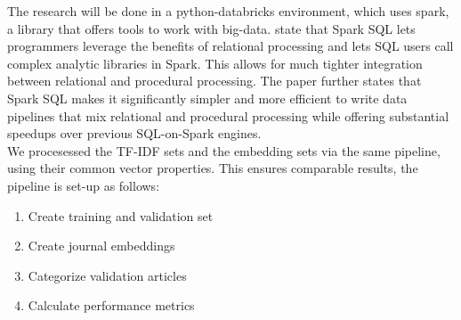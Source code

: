 \documentclass[../../Thesis.tex]{subfiles}
\begin{document}
The research will be done in a python-databricks environment, which uses spark, a library that offers tools to work with big-data. \citet{armbrust2015spark} state that Spark SQL lets programmers leverage the benefits of relational processing and lets SQL users call complex analytic libraries in Spark. This allows for much tighter integration between relational and procedural processing. The paper further states that Spark SQL makes it significantly simpler and more efficient to write data pipelines that mix relational and procedural processing while offering substantial speedups over previous SQL-on-Spark engines.\\
We procesessed the TF-IDF sets and the embedding sets via the same pipeline, using their common vector properties. This ensures comparable results, the pipeline is set-up as follows:
\begin{enumerate}
\item{Create training and validation set}
\item{Create journal embeddings}
\item{Categorize validation articles}
\item{Calculate performance metrics}
\end{enumerate}
  
\end{document}
